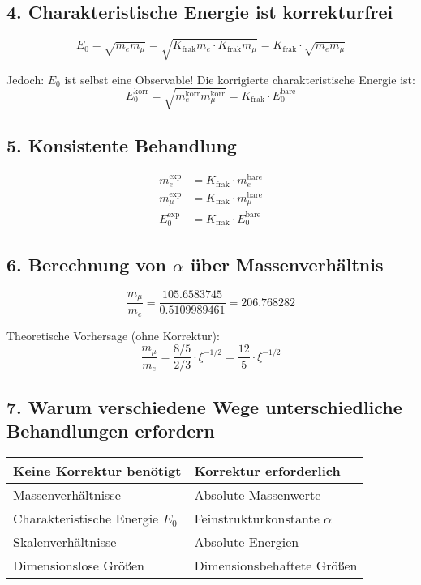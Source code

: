 \documentclass[12pt,a4paper]{article}
\begin{document}
\subsection{4. Charakteristische Energie ist korrekturfrei}

\[
E_0 = \sqrt{m_e m_\mu} = \sqrt{K_{\text{frak}} m_e \cdot K_{\text{frak}} m_\mu} = K_{\text{frak}} \cdot \sqrt{m_e m_\mu}
\]

Jedoch: $E_0$ ist selbst eine Observable! Die korrigierte charakteristische Energie ist:
\[
E_0^{\text{korr}} = \sqrt{m_e^{\text{korr}} m_\mu^{\text{korr}}} = K_{\text{frak}} \cdot E_0^{\text{bare}}
\]

\subsection{5. Konsistente Behandlung}

\begin{align*}
	m_e^{\text{exp}} &= K_{\text{frak}} \cdot m_e^{\text{bare}} \\
	m_\mu^{\text{exp}} &= K_{\text{frak}} \cdot m_\mu^{\text{bare}} \\
	E_0^{\text{exp}} &= K_{\text{frak}} \cdot E_0^{\text{bare}}
\end{align*}

\subsection{6. Berechnung von $\alpha$ über Massenverhältnis}

\[
\frac{m_\mu}{m_e} = \frac{105.6583745}{0.5109989461} = 206.768282
\]

Theoretische Vorhersage (ohne Korrektur):
\[
\frac{m_\mu}{m_e} = \frac{8/5}{2/3} \cdot \xi^{-1/2} = \frac{12}{5} \cdot \xi^{-1/2}
\]

\subsection{7. Warum verschiedene Wege unterschiedliche Behandlungen erfordern}

\begin{tabular}{p{}p{}}
	\textbf{Keine Korrektur benötigt} & \textbf{Korrektur erforderlich} \\
	\hline
	Massenverhältnisse & Absolute Massenwerte \\
	Charakteristische Energie $E_0$ & Feinstrukturkonstante $\alpha$ \\
	Skalenverhältnisse & Absolute Energien \\
	Dimensionslose Größen & Dimensionsbehaftete Größen \\
\end{tabular}
\end{document}
